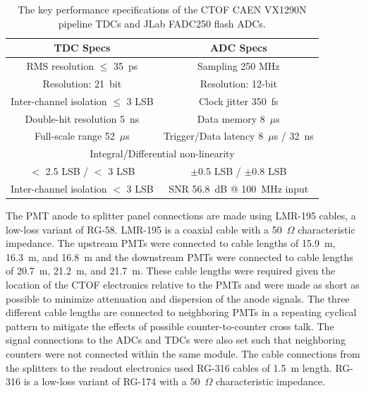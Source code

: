 \documentclass[3p,times,twocolumn]{elsarticle}
\begin{document}
\begin{table}[htbp]
\begin{center}
\begin{tabular}{c|c} \hline
TDC Specs                           & ADC Specs \\ \hline
RMS resolution $\le$ 35~ps          & Sampling 250 MHz \\ \hline 
Resolution: 21~bit                  & Resolution: 12-bit \\ \hline
Inter-channel isolation $\le$ 3 LSB & Clock jitter 350~fs \\ \hline
Double-hit resolution 5~ns          & Data memory 8~$\mu$s \\ \hline    
Full-scale range 52~$\mu$s          & Trigger/Data latency 8~$\mu$s / 32~ns \\ \hline  
\multicolumn{2}{c}{Integral/Differential non-linearity} \\
$<$ 2.5 LSB / $<$ 3 LSB             & $\pm$0.5 LSB / $\pm$0.8 LSB \\ \hline
Inter-channel isolation $<$ 3 LSB   & SNR 56.8~dB @ 100~MHz input \\ \hline
\end{tabular}
\end{center}
\caption{The key performance specifications of the CTOF CAEN VX1290N pipeline TDCs and JLab 
FADC250 flash ADCs.}
\label{tdcadc-specs}
\end{table}

The PMT anode to splitter panel connections are made using LMR-195 cables, a low-loss variant of RG-58.
LMR-195 is a coaxial cable with a 50~$\Omega$ characteristic impedance. The upstream PMTs were
connected to cable lengths of 15.9~m, 16.3~m, and 16.8~m and the downstream PMTs were connected to
cable lengths of 20.7~m, 21.2~m, and 21.7~m. These cable lengths were required given the location of the
CTOF electronics relative to the PMTs and were made as short as possible to minimize attenuation and
dispersion of the anode signals. The three different cable lengths are connected to neighboring PMTs in
a repeating cyclical pattern to mitigate the effects of possible counter-to-counter cross talk. The signal
connections to the ADCs and TDCs were also set such that neighboring counters were not connected within
the same module. The cable connections from the splitters to the readout electronics used RG-316 cables
of 1.5~m length. RG-316 is a low-loss variant of RG-174 with a 50~$\Omega$ characteristic impedance.
\end{document}
